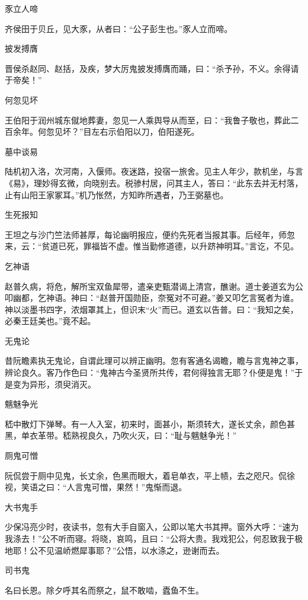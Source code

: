 \documentclass[a4paper,12pt,UTF8,twoside]{ctexbook}
\begin{document}
    豕立人啼
    
    齐侯田于贝丘，见大豕，从者曰：“公子彭生也。”豕人立而啼。
    
    披发搏膺
    
    晋侯杀赵同、赵括，及疾，梦大厉鬼披发搏膺而踊，曰：“杀予孙，不义。余得请于帝矣！”
    
    何忽见坏
    
    王伯阳于润州城东僦地葬妻，忽见一人乘舆导从而至，曰：“我鲁子敬也，葬此二百余年。何忽见坏？”目左右示伯阳以刀，伯阳遂死。
    
    墓中谈易
    
    陆机初入洛，次河南，入偃师。夜迷路，投宿一旅舍。见主人年少，款机坐，与言《易》，理妙得玄微，向晓别去。税骖村居，问其主人，答曰：“此东去并无村落，止有山阳王家冢耳。”机乃怅然，方知昨所遇者，乃王弼墓也。
    
    生死报知
    
    王坦之与沙门竺法师甚厚，每论幽明报应，便约先死者当报其事。后经年，师忽来，云：“贫道已死，罪福皆不虚。惟当勤修道德，以升跻神明耳。”言讫，不见。
    
    乞神语
    
    赵普久病，将危，解所宝双鱼犀带，遣亲吏甄潜谒上清宫，醮谢。道士姜道玄为公叩幽都，乞神语。神曰：“赵普开国勋臣，奈冤对不可避。”姜又叩乞言冤者为谁。神以淡墨书四字，浓烟罩其上，但识末“火”而已。道玄以告普。曰：“我知之矣，必秦王廷美也。”竟不起。
    
    无鬼论
    
    昔阮瞻素执无鬼论，自谓此理可以辨正幽明。忽有客通名谒瞻，瞻与言鬼神之事，辨论良久。客乃作色曰：“鬼神古今圣贤所共传，君何得独言无耶？仆便是鬼！”于是变为异形，须臾消灭。
    
    魑魅争光
    
    嵇中散灯下弹琴。有一人入室，初来时，面甚小，斯须转大，遂长丈余，颜色甚黑，单衣革带。嵇熟视良久，乃吹火灭，曰：“耻与魑魅争光！”
    
    厕鬼可憎
    
    阮侃尝于厕中见鬼，长丈余，色黑而眼大，着皂单衣，平上帻，去之咫尺。侃徐视，笑语之曰：“人言鬼可憎，果然！”鬼惭而退。
    
    大书鬼手
    
    少保冯亮少时，夜读书，忽有大手自窗入，公即以笔大书其押。窗外大呼：“速为我涤去！”公不听而寝。将晓，哀鸣，且曰：“公将大贵。我戏犯公，何忍致我于极地耶！公不见温峤燃犀事耶？”公悟，以水涤之，逊谢而去。
    
    司书鬼
    
    名曰长恩。除夕呼其名而祭之，鼠不敢啮，蠹鱼不生。
    
\end{document}
